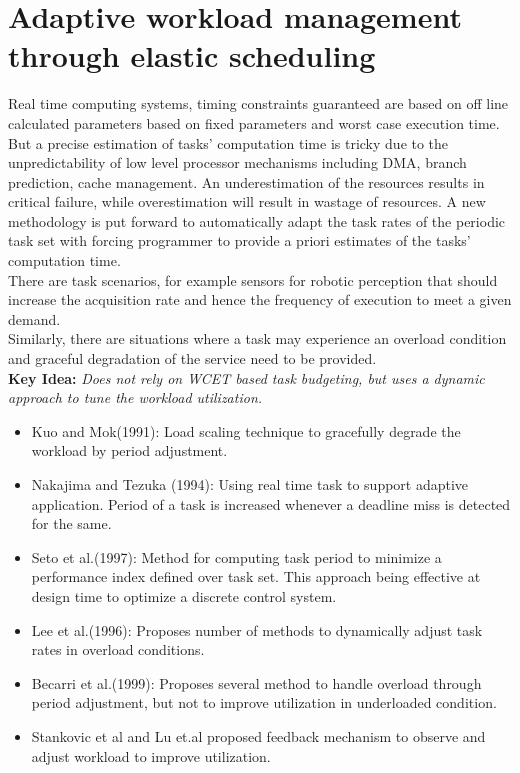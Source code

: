 \section{Adaptive workload management through elastic scheduling}
Real time computing systems, timing constraints guaranteed are based on off line calculated parameters based on fixed parameters and worst case execution time.
But a precise estimation of tasks' computation time is tricky due to the unpredictability of low level processor mechanisms including DMA, branch prediction, cache management.
An underestimation of the resources results in critical failure, while overestimation will result in wastage of resources.
A new methodology is put forward to automatically adapt the task rates of the periodic task set with forcing programmer to provide a priori estimates of the tasks' computation time. \\
There are task scenarios, for example sensors for robotic perception that should increase the acquisition rate and hence the frequency of execution to meet a given demand.\\
Similarly, there are situations where a task may experience an overload condition and graceful degradation of the service need to be provided.\\
\textbf{\textbf{Key Idea:}} \textit{Does not rely on WCET based task budgeting, but uses a dynamic approach to tune the workload utilization.}
\begin{itemize}
	\item Kuo and Mok(1991): Load scaling technique to gracefully degrade the workload by period adjustment.
	\item Nakajima and Tezuka (1994): Using real time task to support adaptive application. Period of a task is increased whenever a deadline miss is detected for the same.
	\item Seto et al.(1997): Method for computing task period to minimize a performance index defined over task set. This approach being effective at design time to optimize a discrete control system.
	\item Lee et al.(1996): Proposes number of methods to dynamically adjust task rates in overload conditions.
	\item Becarri et al.(1999): Proposes several method to handle overload through period adjustment, but not to improve utilization in underloaded condition.
	\item Stankovic et al and Lu et.al proposed feedback mechanism to observe and adjust workload to improve utilization.
\end{itemize}

